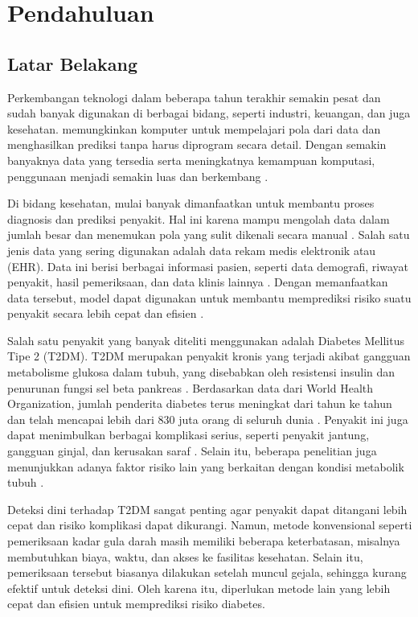 \chapter{Pendahuluan}

\section{Latar Belakang}
Perkembangan teknologi  dalam beberapa tahun terakhir semakin pesat dan sudah banyak digunakan di berbagai bidang, seperti industri, keuangan, dan juga kesehatan.  memungkinkan komputer untuk mempelajari pola dari data dan menghasilkan prediksi tanpa harus diprogram secara detail. Dengan semakin banyaknya data yang tersedia serta meningkatnya kemampuan komputasi, penggunaan  menjadi semakin luas dan berkembang \cite{ref1}.

Di bidang kesehatan,  mulai banyak dimanfaatkan untuk membantu proses diagnosis dan prediksi penyakit. Hal ini karena  mampu mengolah data dalam jumlah besar dan menemukan pola yang sulit dikenali secara manual \cite{ref2}. Salah satu jenis data yang sering digunakan adalah data rekam medis elektronik atau  (EHR). Data ini berisi berbagai informasi pasien, seperti data demografi, riwayat penyakit, hasil pemeriksaan, dan data klinis lainnya \cite{ref3}. Dengan memanfaatkan data tersebut, model  dapat digunakan untuk membantu memprediksi risiko suatu penyakit secara lebih cepat dan efisien \cite{ref4,ref5}.

Salah satu penyakit yang banyak diteliti menggunakan  adalah Diabetes Mellitus Tipe 2 (T2DM). T2DM merupakan penyakit kronis yang terjadi akibat gangguan metabolisme glukosa dalam tubuh, yang disebabkan oleh resistensi insulin dan penurunan fungsi sel beta pankreas \cite{ref6}. Berdasarkan data dari World Health Organization, jumlah penderita diabetes terus meningkat dari tahun ke tahun dan telah mencapai lebih dari 830 juta orang di seluruh dunia \cite{ref7}. Penyakit ini juga dapat menimbulkan berbagai komplikasi serius, seperti penyakit jantung, gangguan ginjal, dan kerusakan saraf \cite{ref8}. Selain itu, beberapa penelitian juga menunjukkan adanya faktor risiko lain yang berkaitan dengan kondisi metabolik tubuh \cite{ref9}.

Deteksi dini terhadap T2DM sangat penting agar penyakit dapat ditangani lebih cepat dan risiko komplikasi dapat dikurangi. Namun, metode konvensional seperti pemeriksaan kadar gula darah masih memiliki beberapa keterbatasan, misalnya membutuhkan biaya, waktu, dan akses ke fasilitas kesehatan. Selain itu, pemeriksaan tersebut biasanya dilakukan setelah muncul gejala, sehingga kurang efektif untuk deteksi dini. Oleh karena itu, diperlukan metode lain yang lebih cepat dan efisien untuk memprediksi risiko diabetes.


